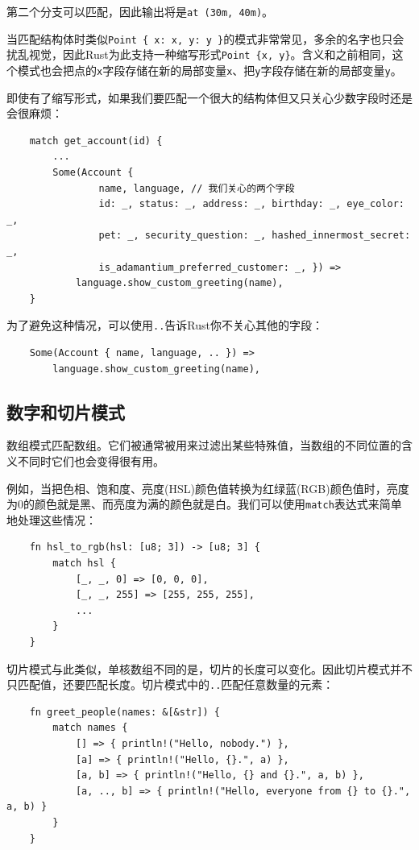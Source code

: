 第二个分支可以匹配，因此输出将是\texttt{at (30m, 40m)}。

当匹配结构体时类似\texttt{Point \{ x: x, y: y \}}的模式非常常见，多余的名字也只会扰乱视觉，因此Rust为此支持一种缩写形式\texttt{Point \{x, y\}}。含义和之前相同，这个模式也会把点的\texttt{x}字段存储在新的局部变量\texttt{x}、把\texttt{y}字段存储在新的局部变量\texttt{y}。

即使有了缩写形式，如果我们要匹配一个很大的结构体但又只关心少数字段时还是会很麻烦：
\begin{verbatim}
    match get_account(id) {
        ...
        Some(Account {
                name, language, // 我们关心的两个字段
                id: _, status: _, address: _, birthday: _, eye_color: _,
                pet: _, security_question: _, hashed_innermost_secret: _,
                is_adamantium_preferred_customer: _, }) =>
            language.show_custom_greeting(name),
    }
\end{verbatim}

为了避免这种情况，可以使用\texttt{..}告诉Rust你不关心其他的字段：
\begin{verbatim}
    Some(Account { name, language, .. }) =>
        language.show_custom_greeting(name),
\end{verbatim}

\subsection{数字和切片模式}
数组模式匹配数组。它们被通常被用来过滤出某些特殊值，当数组的不同位置的含义不同时它们也会变得很有用。

例如，当把色相、饱和度、亮度(HSL)颜色值转换为红绿蓝(RGB)颜色值时，亮度为0的颜色就是黑、而亮度为满的颜色就是白。我们可以使用\texttt{match}表达式来简单地处理这些情况：
\begin{verbatim}
    fn hsl_to_rgb(hsl: [u8; 3]) -> [u8; 3] {
        match hsl {
            [_, _, 0] => [0, 0, 0],
            [_, _, 255] => [255, 255, 255],
            ...
        }
    }
\end{verbatim}

切片模式与此类似，单核数组不同的是，切片的长度可以变化。因此切片模式并不只匹配值，还要匹配长度。切片模式中的\texttt{..}匹配任意数量的元素：
\begin{verbatim}
    fn greet_people(names: &[&str]) {
        match names {
            [] => { println!("Hello, nobody.") },
            [a] => { println!("Hello, {}.", a) },
            [a, b] => { println!("Hello, {} and {}.", a, b) },
            [a, .., b] => { println!("Hello, everyone from {} to {}.", a, b) }
        }
    }
\end{verbatim}

